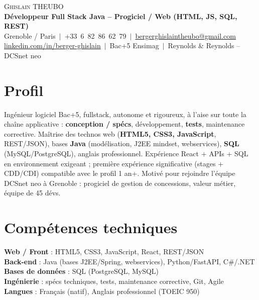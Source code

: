 \documentclass[a4paper,10.5pt]{article}
\begin{document}
\begin{center}
{\Huge \scshape Ghislain THEUBO}\\[2pt]
\textbf{D\'eveloppeur Full Stack Java -- Progiciel / Web (HTML, JS, SQL, REST)}\\[2pt]
\small Grenoble / Paris $\,|\,$ +33~6~82~86~62~79 $\,|\,$ \href{mailto:bergerghislaintheubo@gmail.com}{bergerghislaintheubo@gmail.com}\\[1pt]
\href{https://www.linkedin.com/in/berger-ghislain}{linkedin.com/in/berger-ghislain} $\,|\,$ Bac+5 Ensimag $\,|\,$ Reynolds \& Reynolds -- DCSnet neo
\end{center}

\section{Profil}
\small{
Ing\'enieur logiciel Bac+5, fullstack, autonome et rigoureux, \`a l'aise sur toute la cha\^ine
applicative : \textbf{conception / sp\'ecs}, d\'eveloppement, \textbf{tests}, maintenance corrective.
Ma\^itrise des technos web (\textbf{HTML5, CSS3, JavaScript}, REST/JSON), bases \textbf{Java} (mod\'elisation, J2EE mindset, webservices),
\textbf{SQL} (MySQL/PostgreSQL), anglais professionnel. Exp\'erience React + APIs + SQL en environnement
exigeant ; premi\`ere exp\'erience significative (stages + CDD/CDI) compatible avec le profil 1 an+.
Motiv\'e pour rejoindre l'\'equipe DCSnet neo \`a Grenoble : progiciel de gestion de concessions, valeur m\'etier, \'equipe de 45 d\'evs.
}

\section{Comp\'etences techniques}
\begin{itemize}[leftmargin=0.08in,label={}]\small{\item{
\textbf{Web / Front} : HTML5, CSS3, JavaScript, React, REST/JSON \\
\textbf{Back-end} : Java (bases J2EE/Spring, webservices), Python/FastAPI, C\#/.NET \\
\textbf{Bases de donn\'ees} : SQL (PostgreSQL, MySQL) \\
\textbf{Ing\'enierie} : sp\'ecs techniques, tests, maintenance corrective, Git, Agile \\
\textbf{Langues} : Fran\c{c}ais (natif), Anglais professionnel (TOEIC 950)
}}\end{itemize}
\end{document}
